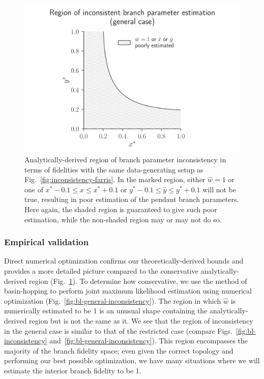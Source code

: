 \documentclass{article}
\begin{document}
\begin{figure}
\centering
\includegraphics[width=\textwidth]{bl-loose-inconsistency-inkscape}
\caption{
    Analytically-derived region of branch parameter inconsistency in terms of fidelities with the same data-generating setup as Fig.~\ref{fig:inconsistency-farris}.
    In the marked region, either $\hat{w}=1$ or one of $x^*-0.1 \le \hat{x} \le x^*+0.1$ or $y^*-0.1 \le \hat{y} \le y^*+0.1$ will not be true, resulting in poor estimation of the pendant branch parameters.
Here again, the shaded region is guaranteed to give such poor estimation, while the non-shaded region may or may not do so.
}
\label{fig:bl-loose-inconsistency}
\end{figure}

\subsubsection*{Empirical validation}

Direct numerical optimization confirms our theoretically-derived bounds and provides a more detailed picture compared to the conservative analytically-derived region (Fig.~\ref{fig:bl-loose-inconsistency}).
To determine how conservative, we use the method of basin-hopping \cite{Wales1997} to perform joint maximum likelihood estimation using numerical optimization (Fig.~\ref{fig:bl-general-inconsistency}).
The region in which $\hat{w}$ is numerically estimated to be 1 is an unusual shape containing the analytically-derived region but is not the same as it.
We see that the region of inconsistency in the general case is similar to that of the restricted case (compare Figs.~\ref{fig:bl-inconsistency} and~\ref{fig:bl-general-inconsistency}).
This region encompasses the majority of the branch fidelity space; even given the correct topology and performing our best possible optimization, we have many situations where we will estimate the interior branch fidelity to be 1.
\end{document}
